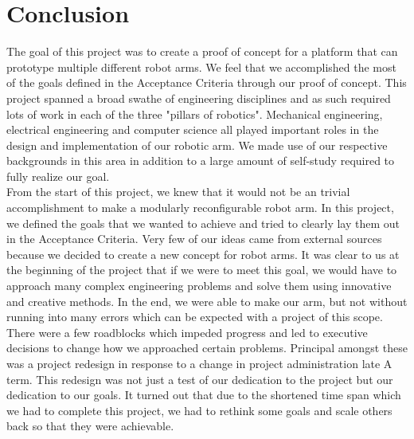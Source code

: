 \section{Conclusion}

The goal of this project was to create a proof of concept for a platform that can prototype multiple different robot arms. We feel that we accomplished the most of the goals defined in the Acceptance Criteria through our proof of concept. This project spanned a broad swathe of engineering disciplines and as such required lots of work in each of the three "pillars of robotics". Mechanical engineering, electrical engineering and computer science all played important roles in the design and implementation of our robotic arm. We made use of our respective backgrounds in this area in addition to a large amount of self-study required to fully realize our goal. \\
\newline
\noindent From the start of this project, we knew that it would not be an trivial accomplishment to make a modularly reconfigurable robot arm. In this project, we defined the goals that we wanted to achieve and tried to clearly lay them out in the Acceptance Criteria. Very few of our ideas came from external sources because we decided to create a new concept for robot arms. It was clear to us at the beginning of the project that if we were to meet this goal, we would have to approach many complex engineering problems and solve them using innovative and creative methods. In the end, we were able to make our arm, but not without running into many errors which can be expected with a project of this scope. There were a few roadblocks which impeded progress and led to executive decisions to change how we approached certain problems. Principal amongst these was a project redesign in response to a change in project administration late A term. This redesign was not just a test of our dedication to the project but our dedication to our goals. It turned out that due to the shortened time span which we had to complete this project, we had to rethink some goals and scale others back so that they were achievable. \\
\newline
